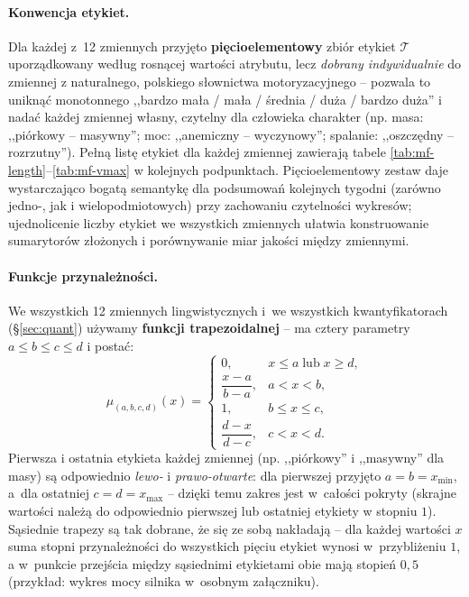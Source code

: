 \documentclass{article}
\begin{document}
\paragraph{Konwencja etykiet.} Dla każdej z~12 zmiennych przyjęto
\textbf{pięcioelementowy} zbiór etykiet $\mathcal{T}$ uporządkowany
według rosnącej wartości atrybutu, lecz \emph{dobrany indywidualnie}
do zmiennej z naturalnego, polskiego słownictwa motoryzacyjnego --
pozwala to uniknąć monotonnego ,,bardzo mała / mała / średnia / duża /
bardzo duża'' i nadać każdej zmiennej własny, czytelny dla człowieka
charakter (np. masa: ,,piórkowy -- masywny''; moc:
,,anemiczny -- wyczynowy''; spalanie: ,,oszczędny -- rozrzutny'').
Pełną listę etykiet dla każdej zmiennej zawierają tabele
\ref{tab:mf-length}--\ref{tab:mf-vmax} w kolejnych podpunktach.
Pięcioelementowy zestaw daje wystarczająco bogatą semantykę dla
podsumowań kolejnych tygodni (zarówno jedno-, jak i wielopodmiotowych)
przy zachowaniu czytelności wykresów; ujednolicenie liczby etykiet we
wszystkich zmiennych ułatwia konstruowanie sumarytorów złożonych
i porównywanie miar jakości między zmiennymi.

\paragraph{Funkcje przynależności.} We wszystkich 12 zmiennych
lingwistycznych i~we wszystkich kwantyfikatorach (\S\ref{sec:quant})
używamy \textbf{funkcji trapezoidalnej} -- ma cztery parametry
$a \le b \le c \le d$ i postać:
\begin{equation}
\label{eq:trapez}
    \mu_{(a,b,c,d)}(x) =
    \begin{cases}
        0, & x \le a \;\text{lub}\; x \ge d,\\[2pt]
        \dfrac{x-a}{b-a}, & a < x < b,\\[6pt]
        1, & b \le x \le c,\\[2pt]
        \dfrac{d-x}{d-c}, & c < x < d.
    \end{cases}
\end{equation}
Pierwsza i ostatnia etykieta każdej zmiennej (np. ,,piórkowy'' i
,,masywny'' dla masy) są odpowiednio \emph{lewo-} i \emph{prawo-otwarte}:
dla pierwszej przyjęto $a=b=x_{\min}$, a~dla ostatniej $c=d=x_{\max}$ --
dzięki temu zakres jest w~całości pokryty (skrajne wartości należą do
odpowiednio pierwszej lub ostatniej etykiety w stopniu $1$).
Sąsiednie trapezy są tak dobrane, że się ze sobą nakładają -- dla
każdej wartości $x$ suma stopni przynależności do wszystkich pięciu
etykiet wynosi w~przybliżeniu $1$, a w~punkcie przejścia między
sąsiednimi etykietami obie mają stopień $0{,}5$ (przykład:
wykres mocy silnika w~osobnym załączniku).
\end{document}
